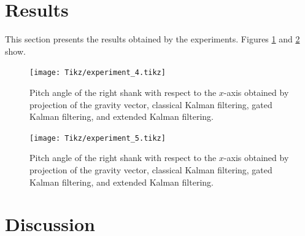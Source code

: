 \section{Results}

This section presents the results obtained by the experiments. Figures \ref{fig:experiment_4} and \ref{fig:experiment_5} show.

\begin{figure}
	\centering
	\setlength\figureheight{7cm} 
	\setlength\figurewidth{\textwidth}
	\texttt{[image: Tikz/experiment\_4.tikz]}
	\caption{Pitch angle of the right shank with respect to the $x$-axis obtained by projection of the gravity vector, classical Kalman filtering, gated Kalman filtering, and extended Kalman filtering.}
	\label{fig:experiment_4}
\end{figure}

\begin{figure}
	\centering
	\setlength\figureheight{7cm} 
	\setlength\figurewidth{\textwidth}
	\texttt{[image: Tikz/experiment\_5.tikz]}
	\caption{Pitch angle of the right shank with respect to the $x$-axis obtained by projection of the gravity vector, classical Kalman filtering, gated Kalman filtering, and extended Kalman filtering.}
	\label{fig:experiment_5}
\end{figure}

\section{Discussion}

